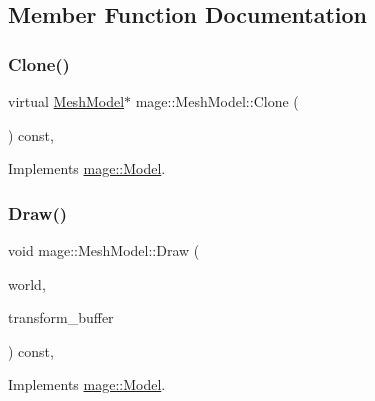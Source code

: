\subsection{Member Function Documentation}
\hypertarget{classmage_1_1_mesh_model_a7130eca9a1dac038c33b838c15138161}{}\label{classmage_1_1_mesh_model_a7130eca9a1dac038c33b838c15138161} 
\subsubsection{\texorpdfstring{Clone()}{Clone()}}
{\footnotesize\ttfamily virtual \hyperlink{classmage_1_1_mesh_model}{Mesh\+Model}$\ast$ mage\+::\+Mesh\+Model\+::\+Clone (\begin{DoxyParamCaption}{ }\end{DoxyParamCaption}) const\hspace{0.3cm}{\ttfamily [override]}, {\ttfamily [virtual]}}



Implements \hyperlink{classmage_1_1_model_ae5e9bee52da0db8c7a29920c13ed40ea}{mage\+::\+Model}.

\hypertarget{classmage_1_1_mesh_model_a80ef930e0ce901293106ce4ea1336e26}{}\label{classmage_1_1_mesh_model_a80ef930e0ce901293106ce4ea1336e26} 
\subsubsection{\texorpdfstring{Draw()}{Draw()}}
{\footnotesize\ttfamily void mage\+::\+Mesh\+Model\+::\+Draw (\begin{DoxyParamCaption}\item[{const \hyperlink{classmage_1_1_world}{World} \&}]{world,  }\item[{const Transform\+Buffer \&}]{transform\+\_\+buffer }\end{DoxyParamCaption}) const\hspace{0.3cm}{\ttfamily [override]}, {\ttfamily [virtual]}}



Implements \hyperlink{classmage_1_1_model_a766c89cdac2e3df748cd73f8ed8bbff5}{mage\+::\+Model}.

\hypertarget{classmage_1_1_mesh_model_a16adbbbab2041bfe0b15d3fb108d57cf}{}\label{classmage_1_1_mesh_model_a16adbbbab2041bfe0b15d3fb108d57cf} 
